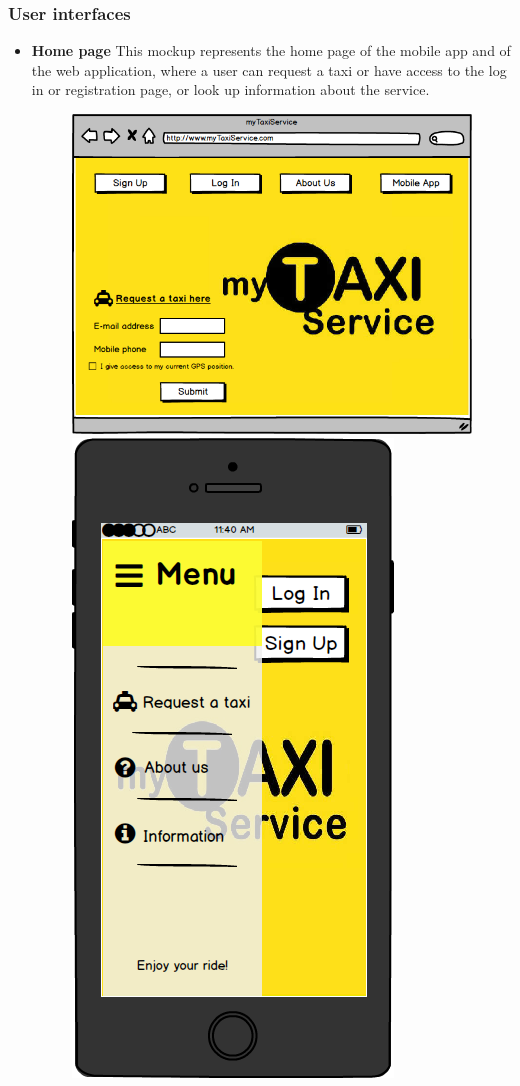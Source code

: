 \documentclass[18pt,oneside,a4paper, titlepage]{article}
\begin{document}
		\subsubsection{User interfaces}
			\begin{itemize}
				\item \textbf{Home page} This mockup represents the home page of the mobile app and of the web application, where a user can request a taxi or have access to the log in or registration page, or look up information about the service.
				\begin{figure}[h]
					\includegraphics[scale=0.3]{WebAppHomepage.png}%
					\qquad\qquad
					\includegraphics[scale=0.3]{MobileAppHomepage.png}
				

\end{figure}
\end{itemize}
\end{document}
